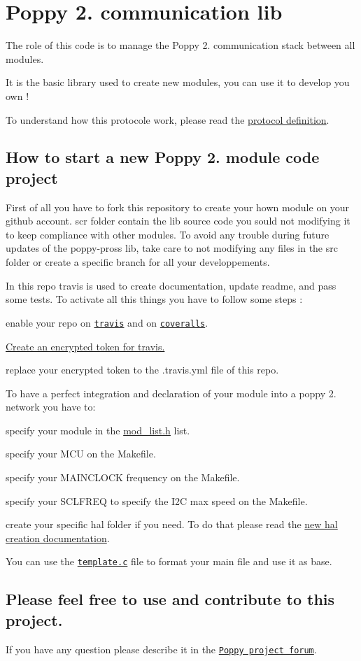 \section*{Poppy 2. communication lib }

The role of this code is to manage the Poppy 2. communication stack between all modules.

It is the basic library used to create new modules, you can use it to develop you own !

To understand how this protocole work, please read the \hyperlink{md_doc_protocol_definition}{protocol definition}.

\subsection*{How to start a new Poppy 2. module code project }

First of all you have to fork this repository to create your hown module on your github account. scr folder contain the lib source code you sould not modifying it to keep compliance with other modules. To avoid any trouble during future updates of the poppy-\/pross lib, take care to not modifying any files in the src folder or create a specific branch for all your developpements. 



In this repo travis is used to create documentation, update readme, and pass some tests. To activate all this things you have to follow some steps \-:
\begin{DoxyItemize}
\item enable your repo on \href{https://travis-ci.org/}{\tt travis} and on \href{https://coveralls.io}{\tt coveralls}.
\item \hyperlink{md_doc_travis_encrypt}{Create an encrypted token for travis.}
\item replace your encrypted token to the .travis.\-yml file of this repo.
\end{DoxyItemize}





To have a perfect integration and declaration of your module into a poppy 2. network you have to\-:
\begin{DoxyItemize}
\item specify your module in the \hyperlink{mod__list_8h_source}{mod\-\_\-list.\-h} list.
\item specify your M\-C\-U on the Makefile.
\item specify your M\-A\-I\-N\-C\-L\-O\-C\-K frequency on the Makefile.
\item specify your S\-C\-L\-F\-R\-E\-Q to specify the I2\-C max speed on the Makefile.
\item create your specific hal folder if you need. To do that please read the \hyperlink{md_doc_hal_creation}{new hal creation documentation}.
\end{DoxyItemize}

You can use the \href{template.c}{\tt template.\-c} file to format your main file and use it as base.





\subsection*{Please feel free to use and contribute to this project. }

If you have any question please describe it in the \href{https://forum.poppy-project.org}{\tt Poppy project forum}. 